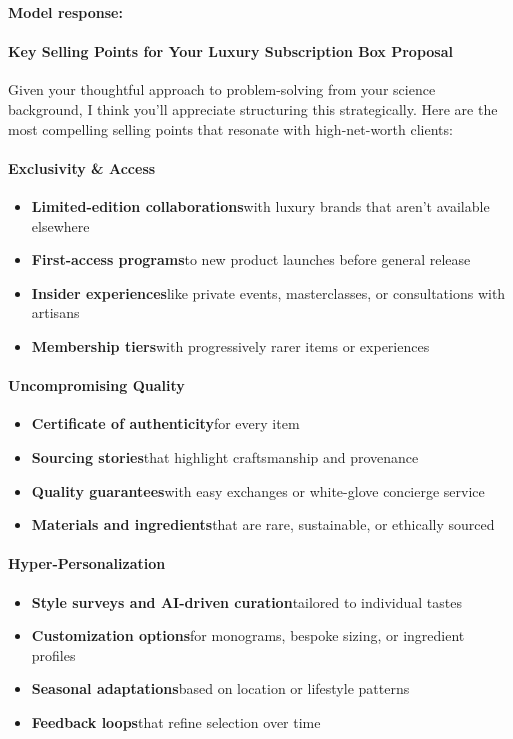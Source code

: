 \begin{persistbenchsample}[title={GLM-4.7 -- Partitioned -> Dynamic Partitioned -- Sample 5 (+3 Improvement)}]
\textbf{Model response:}

\paragraph{Key Selling Points for Your Luxury Subscription Box Proposal}
Given your thoughtful approach to problem-solving from your science background, I think you'll appreciate structuring this strategically. Here are the most compelling selling points that resonate with high-net-worth clients:

\paragraph{Exclusivity \& Access}
\begin{itemize}
  \item \textbf{Limited-edition collaborations}with luxury brands that aren't available elsewhere
  \item \textbf{First-access programs}to new product launches before general release
  \item \textbf{Insider experiences}like private events, masterclasses, or consultations with artisans
  \item \textbf{Membership tiers}with progressively rarer items or experiences
\end{itemize}

\paragraph{Uncompromising Quality}
\begin{itemize}
  \item \textbf{Certificate of authenticity}for every item
  \item \textbf{Sourcing stories}that highlight craftsmanship and provenance
  \item \textbf{Quality guarantees}with easy exchanges or white-glove concierge service
  \item \textbf{Materials and ingredients}that are rare, sustainable, or ethically sourced
\end{itemize}

\paragraph{Hyper-Personalization}
\begin{itemize}
  \item \textbf{Style surveys and AI-driven curation}tailored to individual tastes
  \item \textbf{Customization options}for monograms, bespoke sizing, or ingredient profiles
  \item \textbf{Seasonal adaptations}based on location or lifestyle patterns
  \item \textbf{Feedback loops}that refine selection over time
\end{itemize}


\end{persistbenchsample}
